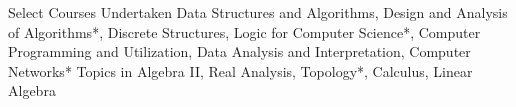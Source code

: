 \begin{rubric}{Select Courses Undertaken}
		Data Structures and Algorithms, Design and Analysis of Algorithms*, Discrete Structures, Logic for Computer Science*, Computer Programming and Utilization, Data Analysis and Interpretation, Computer Networks*%
	\entry*[Mathematics]
		Topics in Algebra II, Real Analysis, Topology*, Calculus, Linear Algebra
\end{rubric}